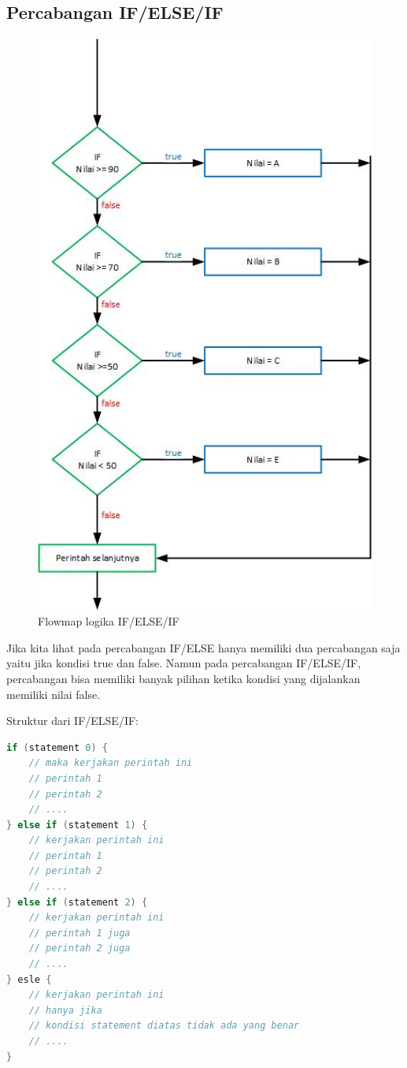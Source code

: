 \subsection{Percabangan IF/ELSE/IF}
\begin{figure}[h!]
    \centering
    \includegraphics[scale=0.5]{pictures/flowmap_if_else_if.jpg}
    \caption{Flowmap logika IF/ELSE/IF}
    \label{}
\end{figure}

Jika kita lihat pada percabangan IF/ELSE hanya memiliki dua percabangan saja yaitu jika kondisi true dan false. Namun  pada percabangan IF/ELSE/IF, percabangan bisa memiliki banyak pilihan ketika kondisi yang dijalankan memiliki nilai false.

Struktur dari IF/ELSE/IF:
\begin{lstlisting}[language=Java]
if (statement 0) {
    // maka kerjakan perintah ini
    // perintah 1
    // perintah 2
    // ....
} else if (statement 1) {
    // kerjakan perintah ini
    // perintah 1
    // perintah 2
    // ....
} else if (statement 2) {
    // kerjakan perintah ini
    // perintah 1 juga
    // perintah 2 juga 
    // ....
} esle {
    // kerjakan perintah ini
    // hanya jika 
    // kondisi statement diatas tidak ada yang benar
    // ....
}    
\end{lstlisting}

